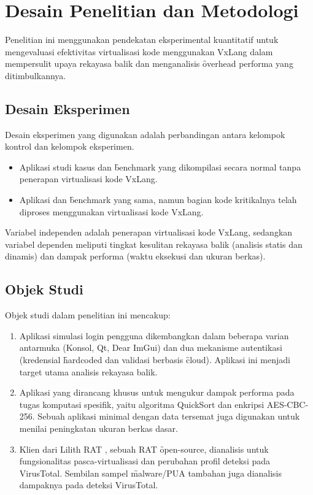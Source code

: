 \section{Desain Penelitian dan Metodologi} %

Penelitian ini menggunakan pendekatan eksperimental kuantitatif untuk mengevaluasi efektivitas virtualisasi kode menggunakan VxLang dalam mempersulit upaya rekayasa balik dan menganalisis \f{overhead} performa yang ditimbulkannya.

\subsection{Desain Eksperimen}
Desain eksperimen yang digunakan adalah perbandingan antara kelompok kontrol dan kelompok eksperimen.
\begin{itemize}
    \item {} Aplikasi studi kasus dan \f{benchmark} yang dikompilasi secara normal tanpa penerapan virtualisasi kode VxLang.
    \item {} Aplikasi dan \f{benchmark} yang sama, namun bagian kode kritikalnya telah diproses menggunakan virtualisasi kode VxLang.
\end{itemize}
Variabel independen adalah penerapan virtualisasi kode VxLang, sedangkan variabel dependen meliputi tingkat kesulitan rekayasa balik (analisis statis dan dinamis) dan dampak performa (waktu eksekusi dan ukuran berkas).

\subsection{Objek Studi}
Objek studi dalam penelitian ini mencakup:
\begin{enumerate}
    \item {} Aplikasi simulasi login pengguna dikembangkan dalam beberapa varian antarmuka (Konsol, Qt, Dear ImGui) dan dua mekanisme autentikasi (kredensial \f{hardcoded} dan validasi berbasis \f{cloud}). Aplikasi ini menjadi target utama analisis rekayasa balik.
    \item {} Aplikasi yang dirancang khusus untuk mengukur dampak performa pada tugas komputasi spesifik, yaitu algoritma QuickSort dan enkripsi AES-CBC-256. Sebuah aplikasi minimal dengan data tersemat juga digunakan untuk menilai peningkatan ukuran berkas dasar.
    \item {} Klien dari Lilith RAT \cite{LilithRAT}, sebuah RAT \f{open-source}, dianalisis untuk fungsionalitas pasca-virtualisasi dan perubahan profil deteksi pada VirusTotal. Sembilan sampel \f{malware}/PUA tambahan juga dianalisis dampaknya pada deteksi VirusTotal.
\end{enumerate}

